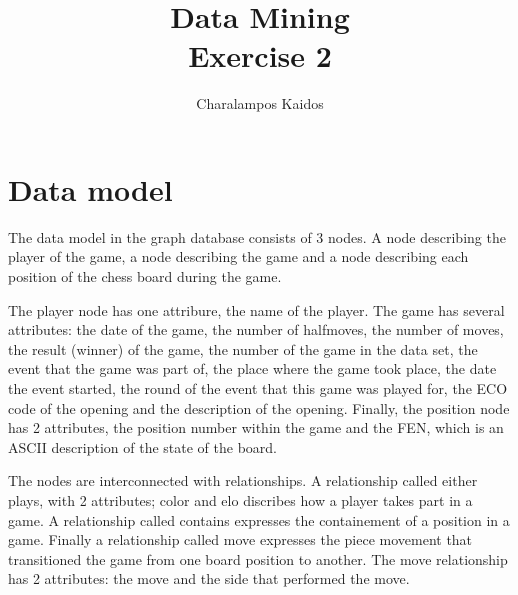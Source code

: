 \documentclass{article}
\begin{document}
\title{Data Mining\\ Exercise 2}
\author{Charalampos Kaidos}

\maketitle

\section*{Data model}

The data model in the graph database consists of 3 nodes. A node describing the
player of the game, a node describing the game and a node describing each
position of the chess board during the game.

The player node has one attribure, the name of the player. The game has several
attributes: the date of the game, the number of halfmoves, the number of moves,
the result (winner) of the game, the number of the game in the data set, the
event that the game was part of, the place where the game took place, the date
the event started, the round of the event that this game was played for, the ECO
code of the opening and the description of the opening. Finally, the position
node has 2 attributes, the position number within the game and the FEN, which is
an ASCII description of the state of the board.

The nodes are interconnected with relationships. A relationship called either
plays, with 2 attributes; color and elo discribes how a player takes part in a
game. A relationship called contains expresses the containement of a position in
a game. Finally a relationship called move expresses the piece movement that
transitioned the game from one board position to another. The move relationship
has 2 attributes: the move and the side that performed the move.
\end{document}
